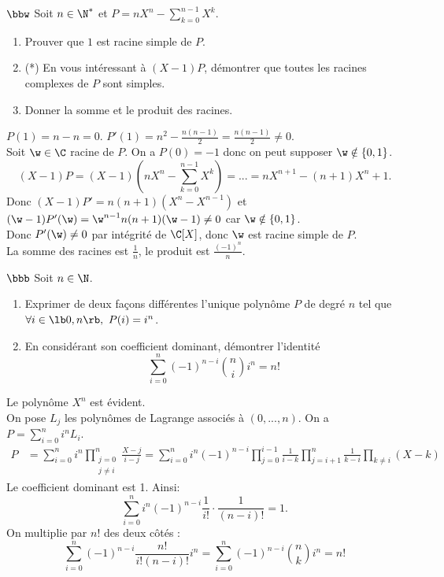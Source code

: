 \documentclass[11pt]{article}
\begin{document}
\vspace*{-0.4cm}

\begin{exercice}{$\bbw$}{}
    Soit $n\in\N^*$ et $P=nX^n-\sum\limits_{k=0}^{n-1}X^k$.
    \begin{enumerate}
        \item Prouver que $1$ est racine simple de $P$.
        \item (*) En vous intéressant à $(X-1)P$, démontrer que toutes les racines complexes de $P$ sont simples.
        \item Donner la somme et le produit des racines.
    \end{enumerate}
    \tcblower
     $P(1)=n-n=0$. $P'(1)=n^2-\frac{n(n-1)}{2}=\frac{n(n-1)}{2}\neq0$.\\
     Soit $\w\in\C$ racine de $P$. On a $P(0)=-1$ donc on peut supposer $\w\notin\{0,1\}$.
    \begin{equation*}
        (X-1)P=(X-1)(nX^n - \sum_{k=0}^{n-1}X^k)=...=nX^{n+1}-(n+1)X^n+1.
    \end{equation*}
    Donc $(X-1)P'=n(n+1)(X^n-X^{n-1})$ et $(\w-1)P'(\w)=\w^{n-1}n(n+1)(\w-1)\neq0$ car $\w\notin\{0,1\}$.\\
    Donc $P'(\w)\neq0$ par intégrité de $\C[X]$, donc $\w$ est racine simple de $P$.\\
     La somme des racines est $\frac{1}{n}$, le produit est $\frac{(-1)^n}{n}$.
\end{exercice}

\begin{exercice}{$\bbb$}{}
    Soit $n\in\N$.
    \begin{enumerate}
        \item Exprimer de deux façons différentes l'unique polynôme $P$ de degré $n$ tel que $\forall i \in \lb0,n\rb, ~ P(i)=i^n$.
        \item En considérant son coefficient dominant, démontrer l'identité
        \begin{equation*}
            \sum_{i=0}^n(-1)^{n-i}\binom{n}{i}i^n=n!
        \end{equation*}
    \end{enumerate}
    \tcblower
     Le polynôme $X^n$ est évident.\\
    On pose $L_j$ les polynômes de Lagrange associés à $(0,...,n)$. On a $P=\sum_{i=0}^ni^nL_i$.
    \begin{align*}
        P&=\sum_{i=0}^ni^n\prod_{\substack{j=0\\j\neq i}}^n\frac{X-j}{i-j}=\sum_{i=0}^ni^n(-1)^{n-i}\prod_{j=0}^{i-1}\frac{1}{i-k}\prod_{j=i+1}^n\frac{1}{k-i}\prod_{k\neq i}(X-k)
    \end{align*}
     Le coefficient dominant est 1. Ainsi:
    \begin{equation*}
        \sum_{i=0}^ni^n(-1)^{n-i}\frac{1}{i!}\cdot\frac{1}{(n-i)!}=1.
    \end{equation*}
    On multiplie par $n!$ des deux côtés :
    \begin{equation*}
        \sum_{i=0}^n(-1)^{n-i}\frac{n!}{i!(n-i)!}i^n=\sum_{i=0}^n(-1)^{n-i}\binom{n}{k}i^n=n!
    \end{equation*}
\end{exercice}
\end{document}
